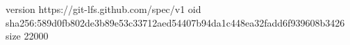 version https://git-lfs.github.com/spec/v1
oid sha256:589d0fb802de3b89e53c33712aed54407b94da1c448ea32fadd6f939608b3426
size 22000
